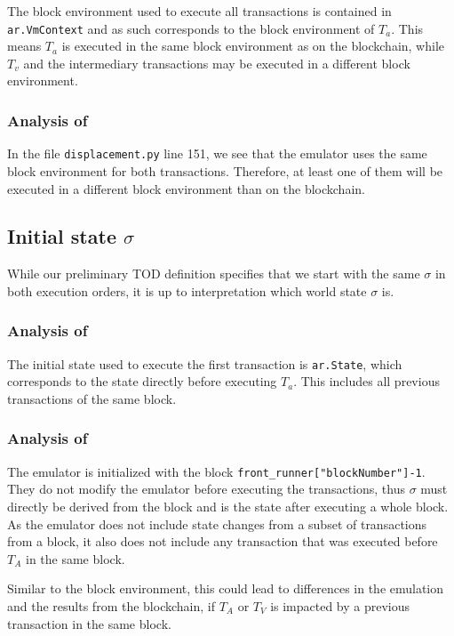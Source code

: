 \documentclass[draft,final]{vutinfth} %
\begin{document}
The block environment used to execute all transactions is contained in \verb|ar.VmContext| and as such corresponds to the block environment of $T_a$. This means $T_a$ is executed in the same block environment as on the blockchain, while $T_v$ and the intermediary transactions may be executed in a different block environment.

\subsubsection{Analysis of \cite{torres_frontrunner_2021}}

In the file \verb|displacement.py| line 151, we see that the emulator uses the same block environment for both transactions. Therefore, at least one of them will be executed in a different block environment than on the blockchain.

\subsection{Initial state $\sigma$}

While our preliminary TOD definition specifies that we start with the same $\sigma$ in both execution orders, it is up to interpretation which world state $\sigma$ is.

\subsubsection{Analysis of \cite{zhang_combatting_2023}}

The initial state used to execute the first transaction is \verb|ar.State|, which corresponds to the state directly before executing $T_a$. This includes all previous transactions of the same block.

\subsubsection{Analysis of \cite{torres_frontrunner_2021}}

The emulator is initialized with the block \verb|front_runner["blockNumber"]-1|. They do not modify the emulator before executing the transactions, thus $\sigma$ must directly be derived from the block and is the state after executing a whole block. As the emulator does not include state changes from a subset of transactions from a block, it also does not include any transaction that was executed before $T_A$ in the same block.

Similar to the block environment, this could lead to differences in the emulation and the results from the blockchain, if $T_A$ or $T_V$ is impacted by a previous transaction in the same block.
\end{document}
